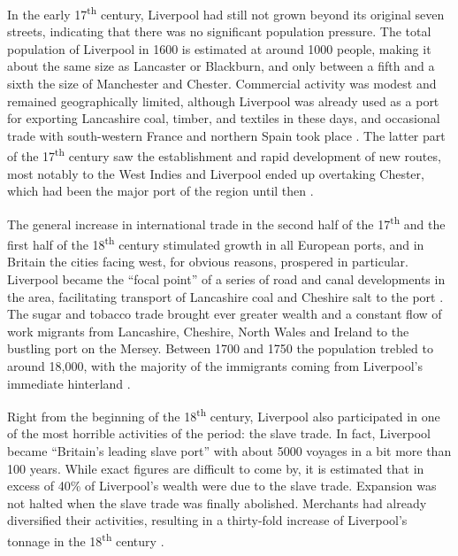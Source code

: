 In the early 17\textsuperscript{th} century, Liverpool had still not grown beyond its original seven streets, indicating that there was no significant population pressure.
The total population of Liverpool in 1600 is estimated at around 1000 people, making it about the same size as Lancaster or Blackburn, and only between a fifth and a sixth the size of Manchester and Chester.
Commercial activity was modest and remained geographically limited, although Liverpool was already used as a port for exporting Lancashire coal, timber, and textiles in these days, and occasional trade with south-western France and northern Spain took place \citeyearpar[cf.][72--76 and 81--84]{kermodeetal2006}.
The latter part of the 17\textsuperscript{th} century saw the establishment and rapid development of new routes, most notably to the West Indies and Liverpool ended up overtaking Chester, which had been the major port of the region until then \citep[cf.][107--110]{kermodeetal2006}.

The general increase in international trade in the second half of the 17\textsuperscript{th} and the first half of the 18\textsuperscript{th} century stimulated growth in all European ports, and in Britain the cities facing west, for obvious reasons, prospered in particular.
Liverpool became the ``focal point'' of a series of road and canal developments in the area, facilitating transport of Lancashire coal and Cheshire salt to the port \citep[129]{longmore2006}.
The sugar and tobacco trade brought ever greater wealth and a constant flow of work migrants from Lancashire, Cheshire, North Wales and Ireland to the bustling port on the Mersey.
Between 1700 and 1750 the population trebled to around 18,000, with the majority of the immigrants coming from Liverpool's immediate hinterland \citep[cf.][114--119 and 169]{longmore2006}.

Right from the beginning of the 18\textsuperscript{th} century, Liverpool also participated in one of the most horrible activities of the period: the slave trade.
In fact, Liverpool became ``Britain's leading slave port'' with about 5000 voyages in a bit more than 100 years.
While exact figures are difficult to come by, it is estimated that in excess of 40\% of Liverpool's wealth were due to the slave trade.
Expansion was not halted when the slave trade was finally abolished.
Merchants had already diversified their activities, resulting in a thirty-fold increase of Liverpool's tonnage in the 18\textsuperscript{th} century \citep[cf.][131--134 and 137]{longmore2006}.

